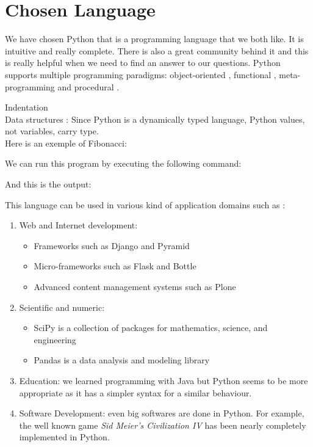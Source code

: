 \section{Chosen Language}
We have chosen Python that is a programming language that we both like. It is intuitive and really complete. There is also a great community behind it and this is really helpful when we need to find an answer to our questions.
Python supports multiple programming paradigms: object-oriented \cite{martelli2006python} \cite{functional_doc}, functional \cite{functional_doc} \cite{devtome}, meta-programming \cite{mihai} and procedural \cite{martelli2006python} \cite{functional_doc}.

Indentation\\
Data structures : Since Python is a dynamically typed language, Python values, not variables, carry type.\\

Here is an exemple of Fibonacci:


We can run this program by executing the following command:


And this is the output:


This language can be used in various kind of application domains such as \cite{python_applications}:
\begin{enumerate}
    \item{Web and Internet development:
        \begin{itemize}
            \item Frameworks such as Django and Pyramid
            \item Micro-frameworks such as Flask and Bottle
            \item Advanced content management systems such as Plone
        \end{itemize}
    }
    \item{Scientific and numeric:
        \begin{itemize}
            \item SciPy is a collection of packages for mathematics, science, and engineering
            \item Pandas is a data analysis and modeling library
        \end{itemize}
    
    }
    \item Education: we learned programming with Java but Python seems to be more appropriate as it has a simpler syntax for a similar behaviour.
    \item Software Development: even big softwares are done in Python. For example, the well known game \emph{Sid Meier's Civilization IV} has been nearly completely implemented in Python.
\end{enumerate}
